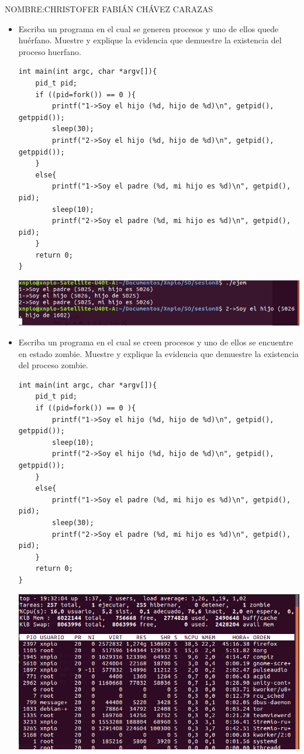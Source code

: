 \documentclass[a4paper,12pt]{article}
\begin{document}
\begin{Large}
 NOMBRE:CHRISTOFER FABIÁN CHÁVEZ CARAZAS
\end{Large}


\begin{itemize}
  
 \item Escriba un programa en el cual se generen procesos y uno de ellos quede huérfano. Muestre y explique la evidencia que demuestre la existencia del proceso huerfano.


\begin{lstlisting}
int main(int argc, char *argv[]){
	pid_t pid;
	if ((pid=fork()) == 0 ){ 
		printf("1->Soy el hijo (%d, hijo de %d)\n", getpid(), getppid());
		sleep(30);
		printf("2->Soy el hijo (%d, hijo de %d)\n", getpid(), getppid());
	}
	else{ 
		printf("1->Soy el padre (%d, mi hijo es %d)\n", getpid(), pid);
		sleep(10);
		printf("2->Soy el padre (%d, mi hijo es %d)\n", getpid(), pid);
	}
	return 0;
}
\end{lstlisting}

\begin{center}
 \includegraphics[scale=0.5]{1.png}
\end{center}
 

\item Escriba un programa en el cual se creen procesos y uno de ellos se encuentre en estado zombie. Muestre y explique la evidencia que demuestre la existencia del proceso zombie.

\begin{lstlisting}
int main(int argc, char *argv[]){
	pid_t pid;
	if ((pid=fork()) == 0 ){ 
		printf("1->Soy el hijo (%d, hijo de %d)\n", getpid(), getppid());
		sleep(10);
		printf("2->Soy el hijo (%d, hijo de %d)\n", getpid(), getppid());
	}
	else{ 
		printf("1->Soy el padre (%d, mi hijo es %d)\n", getpid(), pid);
		sleep(30);
		printf("2->Soy el padre (%d, mi hijo es %d)\n", getpid(), pid);
	}
	return 0;
}
\end{lstlisting}

\begin{center} 
  \includegraphics[scale=0.5]{2.png} 
\end{center}


\end{itemize}
\end{document}
